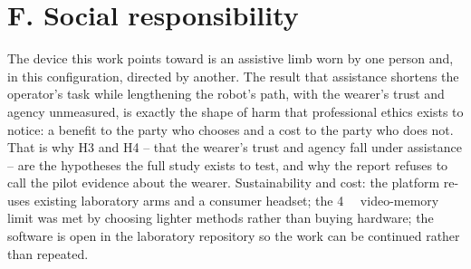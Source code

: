 \section{F. Social responsibility}

The device this work points toward is an assistive limb worn by one person
and, in this configuration, directed by another. The result that
assistance shortens the operator's task while lengthening the robot's
path, with the wearer's trust and agency unmeasured, is exactly the shape
of harm that professional ethics exists to notice: a benefit to the party
who chooses and a cost to the party who does not. That is why H3 and H4 --
that the wearer's trust and agency fall under assistance -- are the
hypotheses the full study exists to test, and why the report refuses to
call the pilot evidence about the wearer. Sustainability and cost: the
platform re-uses existing laboratory arms and a consumer headset; the
\SI{4}{\gibi\byte} video-memory limit was met by choosing lighter methods
rather than buying hardware; the software is open in the laboratory
repository so the work can be continued rather than repeated.
